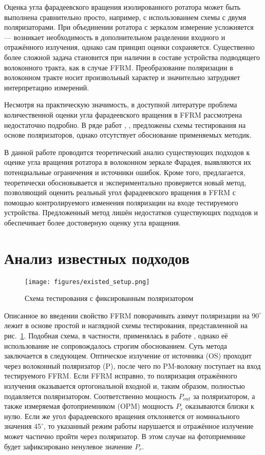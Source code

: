 \documentclass{article}
\begin{document}
Оценка угла фарадеевского вращения изолированного ротатора может быть выполнена сравнительно просто, например, с использованием схемы с двумя поляризаторами\autocite{yinFaradayAngleAccuracy2022}.
При объединении ротатора с зеркалом измерение усложняется — возникает необходимость в дополнительном разделении входного и отражённого излучения, однако сам принцип оценки сохраняется.
Существенно более сложной задача становится при наличии в составе устройства подводящего волоконного тракта, как в случае FFRM.
Преобразование поляризации в волоконном тракте носит произвольный характер и значительно затрудняет интерпретацию измерений.

Несмотря на практическую значимость, в доступной литературе проблема количественной оценки угла фарадеевского вращения в FFRM рассмотрена недостаточно подробно.
В ряде работ \autocite{wanTwoinoneFaradayRotator2014}, \autocite{sunAllFiberOpticalFaraday2010},  \autocite{sunCompactAllfiberOptical2010} предложены схемы тестирования на основе поляризаторов, однако отсутствует обоснование применяемых методик.

В данной работе проводится теоретический анализ существующих подходов к оценке угла вращения ротатора в волоконном зеркале Фарадея, выявляются их потенциальные ограничения и источники ошибок.
Кроме того, предлагается, теоретически обосновывается и экспериментально проверяется новый метод, позволяющий оценить реальный угол фарадеевского вращения в FFRM с помощью контролируемого изменения поляризации на входе тестируемого устройства.
Предложенный метод лишён недостатков существующих подходов и обеспечивает более достоверную оценку угла вращения.

\section{Анализ известных подходов}
\begin{figure}[b]
	\centering
	\texttt{[image: figures/existed\_setup.png]}
	\caption{Схема тестирования с фиксированным поляризатором}
	\label{fig:existed_setup}
\end{figure}

Описанное во введении свойство FFRM поворачивать азимут поляризации на $90^\circ$ лежит в основе простой и наглядной схемы тестирования, представленной на рис.~\ref{fig:existed_setup}.
Подобная схема, в частности, применялась в работе \autocite{wanTwoinoneFaradayRotator2014}, однако её использование не сопровождалось строгим обоснованием.
Суть метода заключается в следующем.
Оптическое излучение от источника (OS) проходит через  волоконный поляризатор (P), после чего по PM-волокну поступает на вход тестируемого FFRM.
Если FFRM исправно, то поляризация отражённого излучения оказывается ортогональной входной и, таким образом, полностью подавляется поляризатором.
Соответственно мощность $P_{out}$ за поляризатором, а также измеряемая фотоприемником (OPM) мощность $P_{r}$ оказываются близки к нулю.
Если же угол фарадеевского вращения отклоняется от номинального значения $45^\circ$, то указанный режим работы нарушается и отражённое излучение может частично пройти через поляризатор.
В этом случае на фотоприемнике будет зафиксировано ненулевое значение $P_r$.
\end{document}
